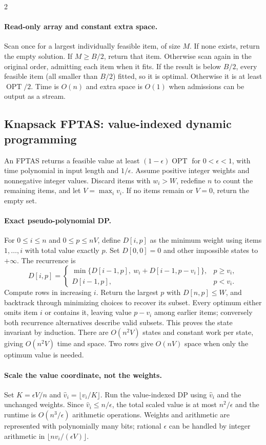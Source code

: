 \documentclass[8pt]{extarticle}
\theoremstyle{definition}
\newcommand{\OPT}{\operatorname{OPT}}
\begin{document}
\begin{multicols*}{2}
\paragraph{Read-only array and constant extra space.}
Scan once for a largest individually feasible item, of size $M$. If none exists, return
the empty solution. If $M\ge B/2$, return that item. Otherwise scan again in the original
order, admitting each item when it fits. If the result is below $B/2$, every feasible item
(all smaller than $B/2$) fitted, so it is optimal. Otherwise it is at least $\OPT/2$.
Time is $O(n)$ and extra space is $O(1)$ when admissions can be output as a stream.

\subsection{Knapsack FPTAS: value-indexed dynamic programming}
\label{gre:fptas}
An FPTAS returns a feasible value at least $(1-\epsilon)\OPT$ for $0<\epsilon<1$, with
time polynomial in input length and $1/\epsilon$. Assume positive integer weights and
nonnegative integer values. Discard items with $w_i>W$, redefine $n$ to count the remaining
items, and let $V=\max_i v_i$. If no items remain or $V=0$, return the empty set.

\paragraph{Exact pseudo-polynomial DP.}
For $0\le i\le n$ and $0\le p\le nV$, define $D[i,p]$ as the minimum
weight using items $1,\ldots,i$ with total value exactly $p$.
Set $D[0,0]=0$ and other impossible states to $+\infty$. The recurrence is
\[
D[i,p]=
\begin{cases}
\min\{D[i-1,p],\ w_i+D[i-1,p-v_i]\},&p\ge v_i,\\
D[i-1,p],&p<v_i.
\end{cases}
\]
Compute rows in increasing $i$. Return the largest $p$ with $D[n,p]\le W$, and backtrack
through minimizing choices to recover its subset. Every optimum either omits item $i$ or
contains it, leaving value $p-v_i$ among earlier items; conversely both recurrence alternatives
describe valid subsets. This proves the state invariant by induction. There are $O(n^2V)$
states and constant work per state, giving $O(n^2V)$ time and space. Two rows give $O(nV)$
space when only the optimum value is needed.

\paragraph{Scale the value coordinate, not the weights.}
Set $K=\epsilon V/n$ and $\hat v_i=\lfloor v_i/K\rfloor$. Run the value-indexed DP using
$\hat v_i$ and the unchanged weights. Since $\hat v_i\le n/\epsilon$, the total scaled
value is at most $n^2/\epsilon$ and the runtime is $O(n^3/\epsilon)$ arithmetic operations.
Weights and arithmetic are represented with polynomially many bits; rational $\epsilon$
can be handled by integer arithmetic in $\lfloor nv_i/(\epsilon V)\rfloor$.


\end{multicols*}
\end{document}
